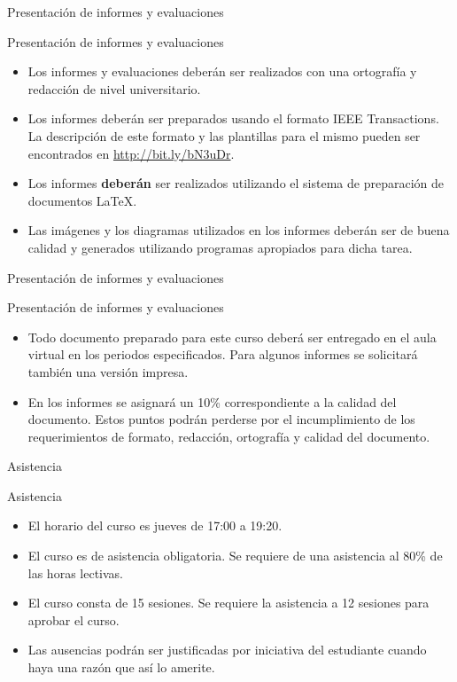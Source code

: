 \documentclass[handout,xcolor=dvipsnames]{beamer}
\newcommand{\pageframe}[1]{\frame{\begin{center}{ \Huge #1 }\end{center}}}
\begin{document}
\pageframe{Observaciones}


\begin{frame}{Presentación de informes y evaluaciones}
\begin{block}{Presentación de informes y evaluaciones}
  \begin{itemize}[<+->]
    \item Los informes y evaluaciones deberán ser realizados con una ortografía y redacción de nivel universitario.
    \item Los informes deberán ser preparados usando el formato IEEE Transactions. La descripción de este formato y las plantillas para el mismo pueden ser encontrados en \url{http://bit.ly/bN3uDr}.
    \item Los informes \textbf{deberán} ser realizados utilizando el sistema de preparación de documentos \LaTeX.
    \item Las imágenes y los diagramas utilizados en los informes deberán ser de buena calidad y generados utilizando programas apropiados para dicha tarea.
  \end{itemize}
\end{block}
\end{frame}


\begin{frame}{Presentación de informes y evaluaciones}
\begin{block}{Presentación de informes y evaluaciones}
  \begin{itemize}[<+->]
    \item Todo documento preparado para este curso deberá ser entregado en el aula virtual en los periodos especificados. Para algunos informes se solicitará también una versión impresa.
    \item En los informes se asignará un 10\% correspondiente a la calidad del documento. Estos puntos podrán perderse por el incumplimiento de los requerimientos de formato, redacción, ortografía y calidad del documento.
  \end{itemize}
\end{block}
\end{frame}


\begin{frame}{Asistencia}
\begin{block}{Asistencia}
  \begin{itemize}[<+->]
  	\item El horario del curso es jueves de 17:00 a 19:20.
    \item El curso es de asistencia obligatoria. Se requiere de una asistencia al 80\% de las horas lectivas.
    \item El curso consta de 15 sesiones. Se requiere la asistencia a 12 sesiones para aprobar el curso.
    \item Las ausencias podrán ser justificadas por iniciativa del estudiante cuando haya una razón que así lo amerite.
  \end{itemize}
\end{block}
\end{frame}
\end{document}
